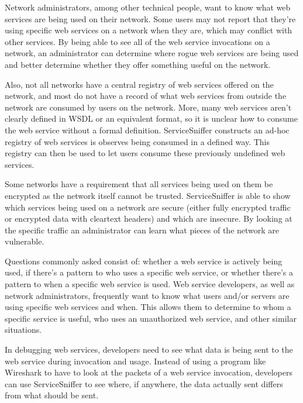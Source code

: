 \documentclass[titlepage]{article}
\begin{document}
Network administrators, among other technical people, want to know what web
services are being used on their network.  Some users may not report that
they're using specific web services on a network when they are, which may 
conflict with other services.  By being able to see all of the web service
invocations on a network, an administrator can determine where rogue web
services are being used and better determine whether they offer something
useful on the network.  

Also, not all networks have a central registry of web services offered on the
network, and most do not have a record of what web services from outside the
network are consumed by users on the network.  More, many web services aren't
clearly defined in WSDL or an equivalent format, so it is unclear how to consume
the web service without a formal definition.  ServiceSniffer constructs an
ad-hoc registry of web services is observes being consumed in a defined way.
This registry can then be used to let users consume these previously undefined
web services.

Some networks have a requirement that all services being used on them be
encrypted as the network itself cannot be trusted.  ServiceSniffer is able to
show which services being used on a network are secure (either fully encrypted
traffic or encrypted data with cleartext headers) and which are insecure.  By
looking at the specific traffic an administrator can learn what pieces of the
network are vulnerable.

Questions commonly asked consist of: whether a web service is actively being used, if
there's a pattern to who uses a specific web service, or whether there's a
pattern to when a specific web service is used.  Web service developers,
as well as network administrators, frequently want to know what users and/or
servers are using specific web services and when.  This allows them to
determine to whom a specific service is useful, who uses an unauthorized web
service, and other similar situations.

In debugging web services, developers need to see what data is being sent to
the web service during invocation and usage.  Instead of using a program like
Wireshark to have to look at the packets of a web service invocation,
developers can use ServiceSniffer to see where, if anywhere, the data actually
sent differs from what should be sent.

\end{document}
